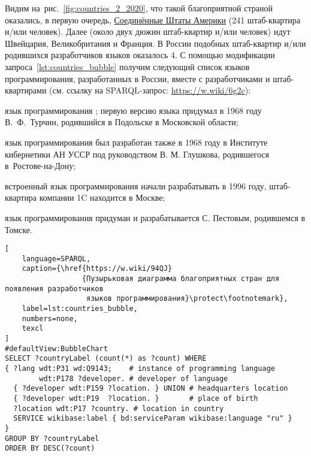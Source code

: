 Видим на~рис.~\ref{fig:countries_2_2020}, 
что такой благоприятной страной оказались, в первую очередь, 
\href{https://en.wikipedia.org/wiki/USA}{Соединённые Штаты Америки} (241 штаб-квартира и/или человек). 
Далее (около двух дюжин штаб-квартир \mbox{и/или} человек) идут 
Швейцария, Великобритания и Франция.  
В России подобных штаб-квартир \mbox{и/или} родившихся разработчиков языков оказалось 4. 
С помощью модификации запроса~\ref{lst:countries_bubble} получим 
следующий список языков программирования, разработанных в России, 
вместе с разработчиками и штаб-квартирами 
(см. ссылку на SPARQL-запрос: \href{https://w.wiki/6g2c}{https://w.wiki/6g2c}):
\begin{compactitemize}
	\item язык программирования ;  
        первую версию языка придумал в 1968 году \mbox{В.~Ф.~Турчин}, 
        родившийся в Подольске в Московской области; 

    \item язык программирования  
        был разработан также в 1968 году в Институте кибернетики АН УССР 
        под руководством В. М. Глушкова, родившегося в~Ростове-на-Дону;

	\item встроенный язык программирования  начали разрабатывать в 1996 году, 
        штаб-квартира компании 1C находится в Москве; 

    \item язык программирования 
        придуман и разрабатывается С. Пестовым, родившемся в Томске.
\end{compactitemize}



\begin{lstlisting}[
	language=SPARQL,
	caption={\href{https://w.wiki/94QJ}
                  {Пузырьковая диаграмма благоприятных стран для появления разработчиков 
                   языков программирования}\protect\footnotemark},
	label=lst:countries_bubble,
    numbers=none,
	texcl
]
#defaultView:BubbleChart
SELECT ?countryLabel (count(*) as ?count) WHERE 
{ ?lang wdt:P31 wd:Q9143;    # instance of programming language
        wdt:P178 ?developer. # developer of language
  { ?developer wdt:P159 ?location. } UNION # headquarters location
  { ?developer wdt:P19  ?location. }       # place of birth
  ?location wdt:P17 ?country. # location in country
  SERVICE wikibase:label { bd:serviceParam wikibase:language "ru" } 	
}
GROUP BY ?countryLabel
ORDER BY DESC(?count)
\end{lstlisting}






